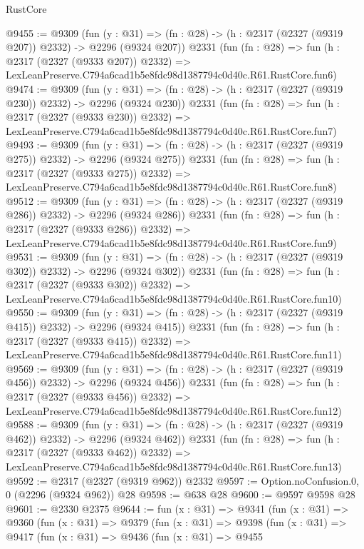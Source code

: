 \begin{lexlean}{RustCore}
\begin{coremodule}
@9455 := @9309
    (fun (y : @31) => (fn : @28) -> (h : @2317 (@2327 (@9319 @207)) @2332) -> @2296 (@9324 @207))
    @2331
    (fun (fn : @28) =>
    fun (h : @2317 (@2327 (@9333 @207)) @2332) =>
    LexLeanPreserve.C794a6cad1b5e8fdc98d1387794c0d40c.R61.RustCore.fun6)
@9474 := @9309
    (fun (y : @31) => (fn : @28) -> (h : @2317 (@2327 (@9319 @230)) @2332) -> @2296 (@9324 @230))
    @2331
    (fun (fn : @28) =>
    fun (h : @2317 (@2327 (@9333 @230)) @2332) =>
    LexLeanPreserve.C794a6cad1b5e8fdc98d1387794c0d40c.R61.RustCore.fun7)
@9493 := @9309
    (fun (y : @31) => (fn : @28) -> (h : @2317 (@2327 (@9319 @275)) @2332) -> @2296 (@9324 @275))
    @2331
    (fun (fn : @28) =>
    fun (h : @2317 (@2327 (@9333 @275)) @2332) =>
    LexLeanPreserve.C794a6cad1b5e8fdc98d1387794c0d40c.R61.RustCore.fun8)
@9512 := @9309
    (fun (y : @31) => (fn : @28) -> (h : @2317 (@2327 (@9319 @286)) @2332) -> @2296 (@9324 @286))
    @2331
    (fun (fn : @28) =>
    fun (h : @2317 (@2327 (@9333 @286)) @2332) =>
    LexLeanPreserve.C794a6cad1b5e8fdc98d1387794c0d40c.R61.RustCore.fun9)
@9531 := @9309
    (fun (y : @31) => (fn : @28) -> (h : @2317 (@2327 (@9319 @302)) @2332) -> @2296 (@9324 @302))
    @2331
    (fun (fn : @28) =>
    fun (h : @2317 (@2327 (@9333 @302)) @2332) =>
    LexLeanPreserve.C794a6cad1b5e8fdc98d1387794c0d40c.R61.RustCore.fun10)
@9550 := @9309
    (fun (y : @31) => (fn : @28) -> (h : @2317 (@2327 (@9319 @415)) @2332) -> @2296 (@9324 @415))
    @2331
    (fun (fn : @28) =>
    fun (h : @2317 (@2327 (@9333 @415)) @2332) =>
    LexLeanPreserve.C794a6cad1b5e8fdc98d1387794c0d40c.R61.RustCore.fun11)
@9569 := @9309
    (fun (y : @31) => (fn : @28) -> (h : @2317 (@2327 (@9319 @456)) @2332) -> @2296 (@9324 @456))
    @2331
    (fun (fn : @28) =>
    fun (h : @2317 (@2327 (@9333 @456)) @2332) =>
    LexLeanPreserve.C794a6cad1b5e8fdc98d1387794c0d40c.R61.RustCore.fun12)
@9588 := @9309
    (fun (y : @31) => (fn : @28) -> (h : @2317 (@2327 (@9319 @462)) @2332) -> @2296 (@9324 @462))
    @2331
    (fun (fn : @28) =>
    fun (h : @2317 (@2327 (@9333 @462)) @2332) =>
    LexLeanPreserve.C794a6cad1b5e8fdc98d1387794c0d40c.R61.RustCore.fun13)
@9592 := @2317 (@2327 (@9319 @962)) @2332
@9597 := Option.noConfusion.{0, 0} (@2296 (@9324 @962)) @28
@9598 := @638 @28
@9600 := @9597 @9598 @28
@9601 := @2330 @2375
@9644 := fun (x : @31) =>
  @9341
    (fun (x : @31) =>
    @9360
      (fun (x : @31) =>
      @9379
        (fun (x : @31) =>
        @9398
          (fun (x : @31) =>
          @9417
            (fun (x : @31) =>
            @9436
              (fun (x : @31) =>
              @9455

\end{coremodule}
\end{lexlean}
